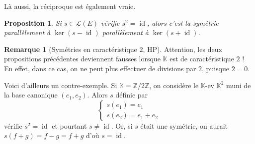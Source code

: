 \documentclass[french]{book}
\newcommand{\Z}{\mathbb{Z}}
\newcommand{\K}{\mathbb{K}}
\theoremstyle{plain}
\newtheorem{prop}{Proposition}[chapter]
\theoremstyle{definition}
\newtheorem{rmq}{Remarque}[chapter]
\theoremstyle{remark}
\DeclareMathOperator{\id}{id}
\begin{document}
Là aussi, la réciproque est également vraie.
\begin{prop}
	Si $s\in\mathcal{L}(E)$ vérifie $s^2=\id$, alors c'est la symétrie parallèlement à $\ker(s-\id)$ parallèlement à $\ker(s+\id)$.
\end{prop}
\begin{rmq}[Symétries en caractéristique $2$, HP]
	Attention, les deux propositions précédentes deviennent fausses lorsque $\K$ est de caractéristique $2$ ! En effet, dans ce cas, on ne peut plus effectuer de divisions par $2$, puisque $2=0$. \par Voici d'ailleurs un contre-exemple. Si $\K=\Z/2\Z$, on considère le $\K$-ev $\K^2$ muni de la base canonique $(e_1,e_2)$. Alors $s$ définie par $$\left \{\begin{array}{ll}s(e_1)=e_1 \\ s(e_2)=e_1+e_2\end{array}\right.$$ vérifie $s^2=\id$ et pourtant $s\ne \id$. Or, si $s$ était une symétrie, on aurait $s(f+g)=f-g=f+g$ d'où $s=\id$. 
\end{rmq}
\end{document}
